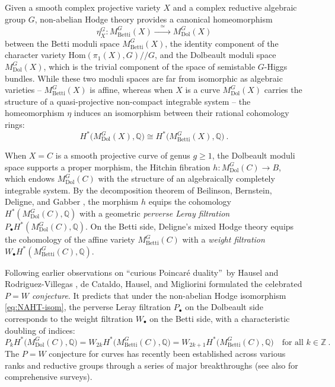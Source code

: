 \documentclass[11pt, a4paper]{amsart}
\theoremstyle{definition}
\theoremstyle{myitemstyle}
\newcommand{\Dol}{{\mathrm{Dol}}}
\newcommand{\Betti}{{\mathrm{Betti}}}
\begin{document}
Given a smooth complex projective variety $X$ and a complex reductive algebraic group $G$, non-abelian Hodge theory provides a canonical homeomorphism
\begin{equation}\label{eq:NAHT-isom}
\eta^G_X \colon M_{\Betti}^G(X) \xrightarrow{\quad \simeq \quad} M_{\Dol}^G(X)
\end{equation}
between the Betti moduli space $M_{\Betti}^G(X)$, the identity component of the character variety $\mathrm{Hom}(\pi_1(X), G) /\!\!/ G$,  and the Dolbeault moduli space $M_{\Dol}^G(X)$, which is the trivial component of the space of semistable $G$-Higgs bundles. While these two moduli spaces are far from isomorphic as algebraic varieties -- $M_{\Betti}^G(X)$ is affine, whereas when $X$ is a curve $M_{\Dol}^G(X)$ carries the structure of a quasi-projective non-compact integrable system -- the homeomorphism $\eta$ induces an isomorphism between their rational cohomology rings:
\[
H^*\big(M_{\Dol}^G(X), \mathbb{Q}\big) \cong H^*\big(M_{\Betti}^G(X), \mathbb{Q}\big) \ .
\]

When $X = C$ is a smooth projective curve of genus $g \ge 1$, the Dolbeault moduli space supports a proper morphism, the Hitchin fibration $h \colon M_{\Dol}^{G}(C) \to B$, which endows $M_{\Dol}^{G}(C)$ with the structure of an algebraically completely integrable system. By the decomposition theorem of Beilinson, Bernstein, Deligne, and Gabber \cite{BBD82}, the morphism $h$ equips the cohomology $H^*(M_{\Dol}^{G}(C), \mathbb{Q})$ with a geometric \emph{perverse Leray filtration} $P_\bullet H^*(M_{\Dol}^{G}(C), \mathbb{Q})$. On the Betti side, Deligne's mixed Hodge theory \cite{Del71, Del74} equips the cohomology of the affine variety $M_{\Betti}^{G}(C)$ with a \emph{weight filtration} $W_\bullet H^*(M_{\Betti}^{G}(C), \mathbb{Q})$.

Following earlier observations on \textquotedblleft curious Poincaré duality\textquotedblright\  by Hausel and Rodriguez-Villegas \cite{HauselRodriguezVillegas}, de Cataldo, Hausel, and Migliorini \cite{dCHM_P=Wn=2} formulated the celebrated \emph{$P=W$ conjecture}. 
It predicts that under the non-abelian Hodge isomorphism \eqref{eq:NAHT-isom}, the perverse Leray filtration $P_\bullet$ on the Dolbeault side corresponds to the weight filtration $W_\bullet$ on the Betti side, with a characteristic doubling of indices:
\begin{equation}\label{eq:P=W-curve}
P_k H^*\big(M_{\Dol}^{G}(C), \mathbb{Q}\big) = W_{2k} H^*\big(M_{\Betti}^{G}(C), \mathbb{Q}\big) = W_{2k+1} H^*\big(M_{\Betti}^{G}(C), \mathbb{Q}\big) \quad \text{for all } k \in \mathbb{Z}\  .
\end{equation}
The $P=W$ conjecture for curves has recently been established across various ranks and reductive groups through a series of major breakthroughs \cite{dCHM_P=Wn=2, dCMS_g=2pprime, dCMS22, MS22, HMMS22, MSY25,FM22} (see also \cite{Migliorini_survey,F25} for comprehensive surveys).
\end{document}
